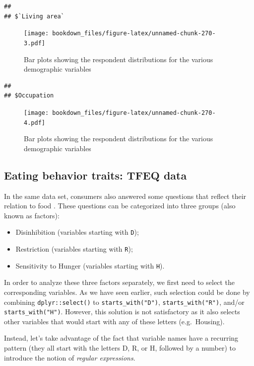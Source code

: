 \documentclass[
]{krantz}
\providecommand{\tightlist}{%
  \setlength{\itemsep}{0pt}\setlength{\parskip}{0pt}}
\begin{document}
\begin{verbatim}
## 
## $`Living area`
\end{verbatim}

\begin{figure}
\centering
\texttt{[image: bookdown\_files/figure-latex/unnamed-chunk-270-3.pdf]}
\caption{\label{fig:unnamed-chunk-270-3}Bar plots showing the respondent distributions for the various demographic variables}
\end{figure}

\begin{verbatim}
## 
## $Occupation
\end{verbatim}

\begin{figure}
\centering
\texttt{[image: bookdown\_files/figure-latex/unnamed-chunk-270-4.pdf]}
\caption{\label{fig:unnamed-chunk-270-4}Bar plots showing the respondent distributions for the various demographic variables}
\end{figure}

\hypertarget{regex}{%
\subsection{Eating behavior traits: TFEQ data}\label{regex}}

In the same data set, consumers also answered some questions that reflect their relation to food \citep{stunkard1985}. These questions can be categorized into three groups (also known as factors):

\begin{itemize}
\tightlist
\item
  Disinhibition (variables starting with \texttt{D});
\item
  Restriction (variables starting with \texttt{R});
\item
  Sensitivity to Hunger (variables starting with \texttt{H}).
\end{itemize}

In order to analyze these three factors separately, we first need to select the corresponding variables. As we have seen earlier, such selection could be done by combining \texttt{dplyr::select()} to \texttt{starts\_with("D")}, \texttt{starts\_with("R")}, and/or \texttt{starts\_with("H")}. However, this solution is not satisfactory as it also selects other variables that would start with any of these letters (e.g.~Housing).

Instead, let's take advantage of the fact that variable names have a recurring pattern (they all start with the letters D, R, or H, followed by a number) to introduce the notion of \emph{regular expressions}.
\end{document}
